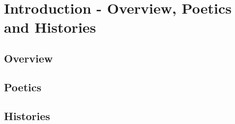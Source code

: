 \chapter{Introduction - Overview, Poetics and Histories}
\section{Overview}
\section{Poetics}
\section{Histories}
